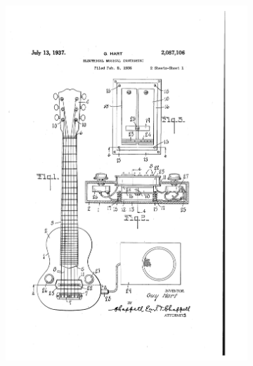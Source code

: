 \documentclass{article}
\begin{document}
\begin{figure}[h]
    \begin{center}
        \begin{subfigure}{0.3\textwidth}
            \includegraphics[scale=0.18]{images/patente3.png}
        \end{subfigure}
        \begin{subfigure}{0.3\textwidth}

\end{subfigure}
\end{center}
\end{figure}
\end{document}
